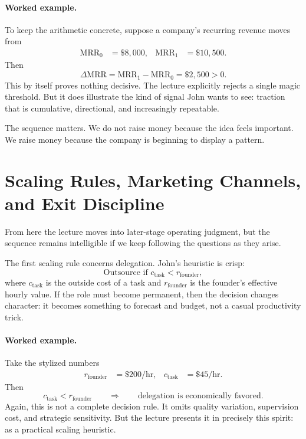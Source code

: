 \paragraph{Worked example.}
To keep the arithmetic concrete, suppose a company's recurring revenue moves from
\begin{align}
\mathrm{MRR}_0 &= \$8{,}000, &
\mathrm{MRR}_1 &= \$10{,}500.
\end{align}
Then
\begin{equation}
\Delta \mathrm{MRR} = \mathrm{MRR}_1 - \mathrm{MRR}_0 = \$2{,}500 > 0.
\end{equation}
This by itself proves nothing decisive. The lecture explicitly rejects a single magic threshold. But it does illustrate the kind of signal John wants to see: traction that is cumulative, directional, and increasingly repeatable.

The sequence matters. We do not raise money because the idea feels important. We raise money because the company is beginning to display a pattern.

\section{Scaling Rules, Marketing Channels, and Exit Discipline}

From here the lecture moves into later-stage operating judgment, but the sequence remains intelligible if we keep following the questions as they arise.

The first scaling rule concerns delegation. John's heuristic is crisp:
\begin{equation}
\text{Outsource if } c_{\mathrm{task}} < r_{\mathrm{founder}},
\end{equation}
where \(c_{\mathrm{task}}\) is the outside cost of a task and \(r_{\mathrm{founder}}\) is the founder's effective hourly value. If the role must become permanent, then the decision changes character: it becomes something to forecast and budget, not a casual productivity trick.

\paragraph{Worked example.}
Take the stylized numbers
\begin{align}
r_{\mathrm{founder}} &= \$200/\text{hr}, &
c_{\mathrm{task}} &= \$45/\text{hr}.
\end{align}
Then
\begin{equation}
c_{\mathrm{task}} < r_{\mathrm{founder}}
\qquad \Longrightarrow \qquad
\text{delegation is economically favored.}
\end{equation}
Again, this is not a complete decision rule. It omits quality variation, supervision cost, and strategic sensitivity. But the lecture presents it in precisely this spirit: as a practical scaling heuristic.


